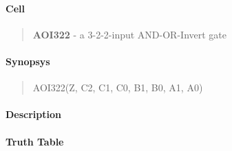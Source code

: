 \label{AOI322}
\paragraph{Cell}
\begin{quote}
    \textbf{AOI322} - a 3-2-2-input AND-OR-Invert gate
\end{quote}

\paragraph{Synopsys}
\begin{quote}
    AOI322(Z, C2, C1, C0, B1, B0, A1, A0)
\end{quote}

\paragraph{Description}



\paragraph{Truth Table}


